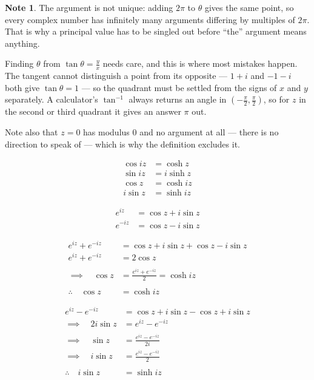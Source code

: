 \documentclass[11pt,a4paper]{article}
\theoremstyle{definition}
\newtheorem{note}[thm]{Note}
\begin{document}
\begin{note}
The argument is not unique: adding $2\pi$ to $\theta$ gives the same point, so
every complex number has infinitely many arguments differing by multiples of
$2\pi$. That is why a principal value has to be singled out before ``the'' argument
means anything.

Finding $\theta$ from $\tan\theta=\frac{y}{x}$ needs care, and this is where most
mistakes happen. The tangent cannot distinguish a point from its opposite ---
$1+i$ and $-1-i$ both give $\tan\theta=1$ --- so the quadrant must be settled from
the signs of $x$ and $y$ separately. A calculator's $\tan^{-1}$ always returns an
angle in $\left(-\frac{\pi}{2},\frac{\pi}{2}\right)$, so for $z$ in the second or
third quadrant it gives an answer $\pi$ out.

Note also that $z=0$ has modulus $0$ and no argument at all --- there is no
direction to speak of --- which is why the definition excludes it.
\end{note}



\begin{align*}
\cos iz & = \cosh z\\
\sin iz & = i\sinh z \\
\cos z & = \cosh iz\\
i \sin z & = \sinh iz
\end{align*}







\begin{align*}
e^{iz} & = \cos z + i\sin z\\
e^{-iz} & = \cos z - i\sin z
\end{align*}



\begin{align*}
e^{iz} + e^{-iz} & = \cos  z + i\sin  z + \cos z - i\sin z\\
e^{iz} + e^{-iz} & = 2\cos z\\\\
\implies \quad  \cos z  &  = \frac{e^{iz} + e^{-iz} }{2} = \cosh i z\\\\
\therefore \quad  \cos z & = \cosh i z
\end{align*}



\begin{align*}
e^{iz} - e^{-iz} & = \cos z + i\sin z - \cos z + i\sin z\\
\implies\quad  2i\sin z & = e^{iz} - e^{-iz} \\\\
\implies \quad  \sin z & = \frac{e^{iz} - e^{-iz}}{2i}\\
\implies \quad  i\sin z & = \frac{e^{iz} - e^{-iz}}{2}\\\\
\therefore\quad  i\sin z & = \sinh iz\\\\
\end{align*}
\end{document}
